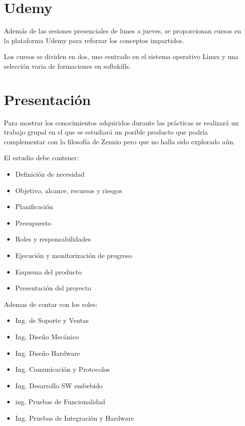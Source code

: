 \section*{Udemy}
\label{sec:udemy}

Además de las sesiones presenciales de lunes a jueves, se proporcionan cursos en la plataforma Udemy para reforzar los conceptos impartidos.

Los cursos se dividen en dos, uno centrado en el sistema operativo Linux y una selección varia de formaciones en softskills.

\section*{Presentación}
\label{sec:presentacion}

Para mostrar los conocimientos adquiridos durante las prácticas se realizará un trabajo grupal en el que se estudiará un posible producto que podría complementar con la filosofía de Zennio pero que no halla sido explorado aún.

El estudio debe contener:
\begin{itemize}
    \item Definición de necesidad
    \item Objetivo, alcance, recursos y riesgos
    \item Planificación
    \item Presupuesto
    \item Roles y responsabilidades
    \item Ejecución y monitorización de progreso
    \item Esquema del producto
    \item Presentación del proyecto
\end{itemize}

Ademas de contar con los roles:
\begin{itemize}
    \item Ing. de Soporte y Ventas
    \item Ing. Diseño Mecánico
    \item Ing. Diseño Hardware
    \item Ing. Comunicación y Protocolos
    \item Ing. Desarrollo SW embebido
    \item ing. Pruebas de Funcionalidad
    \item Ing. Pruebas de Integración y Hardware
\end{itemize}
